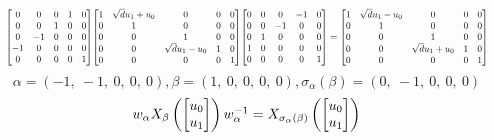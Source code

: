 \documentclass[11pt]{article}
\theoremstyle{definition}
\begin{document}
\[
\scaletoalign{\textwidth}{{\left[\begin{matrix}0 & 0 & 0 & 1 & 0\\0 & 0 & 1 & 0 & 0\\0 & -1 & 0 & 0 & 0\\-1 & 0 & 0 & 0 & 0\\0 & 0 & 0 & 0 & 1\end{matrix}\right]} {\left[\begin{matrix}1 & \sqrt{d} u_{1} + u_{0} & 0 & 0 & 0\\0 & 1 & 0 & 0 & 0\\0 & 0 & 1 & 0 & 0\\0 & 0 & \sqrt{d} u_{1} - u_{0} & 1 & 0\\0 & 0 & 0 & 0 & 1\end{matrix}\right]} {\left[\begin{matrix}0 & 0 & 0 & -1 & 0\\0 & 0 & -1 & 0 & 0\\0 & 1 & 0 & 0 & 0\\1 & 0 & 0 & 0 & 0\\0 & 0 & 0 & 0 & 1\end{matrix}\right]} = {\left[\begin{matrix}1 & \sqrt{d} u_{1} - u_{0} & 0 & 0 & 0\\0 & 1 & 0 & 0 & 0\\0 & 0 & 1 & 0 & 0\\0 & 0 & \sqrt{d} u_{1} + u_{0} & 1 & 0\\0 & 0 & 0 & 0 & 1\end{matrix}\right]}}
\]
\[
\alpha = \left( -1, \  -1, \  0, \  0, \  0\right), \beta = \left( 1, \  0, \  0, \  0, \  0\right), \sigma_{\alpha}(\beta) = \left( 0, \  -1, \  0, \  0, \  0\right)
\]
\[
\scaletoalign{\textwidth}{w_{\alpha} X_{\beta}\left(\left[\begin{matrix}u_{0}\\u_{1}\end{matrix}\right]\right) w_{\alpha}^{-1} = X_{\sigma_{\alpha}\left(\beta\right)}\left(\left[\begin{matrix}u_{0}\\u_{1}\end{matrix}\right]\right)}
\]
\end{document}
